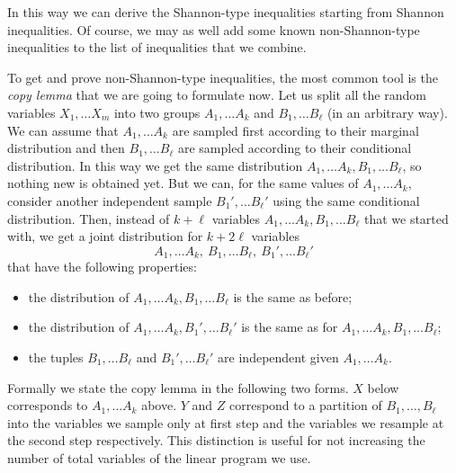 \documentclass[11pt, a4paper]{kybernetika}
\begin{document}
	In this way we can derive the Shannon-type inequalities starting from Shannon inequalities. Of course, we may as well add some known non-Shannon-type inequalities to the list of inequalities that we combine.
	
	To get and prove non-Shannon-type inequalities, the most common tool is the \emph{copy lemma} that we are going to formulate now. Let us split all the random variables $X_1,\ldots X_m$ into two groups $A_1,\ldots A_k$ and $B_1,\ldots B_\ell$ (in an arbitrary way). We can assume that $A_1,\ldots A_k$ are sampled first according to their marginal distribution and then $B_1,\ldots B_\ell$ are sampled according to their conditional distribution. In this way we get the same distribution $A_1,\ldots A_k, B_1,\ldots B_\ell$, so nothing new is obtained yet. But we can, for the same values of $A_1,\ldots A_k$, consider another independent sample $B_1',\ldots B_\ell'$ using the same conditional distribution. Then, instead of $k+\ell$ variables $A_1,\ldots A_k,B_1,\ldots B_\ell$ that we started with, we get a joint distribution for $k+2\ell$ variables
	\[
	A_1,\ldots A_k,\ B_1,\ldots B_\ell,\ B_1',\ldots B_\ell'
	\]
	that have the following properties:
	\begin{itemize}
		\item 
		the distribution of $A_1,\ldots A_k,B_1,\ldots B_\ell$ is the same as before;
		\item
		the distribution of $A_1,\ldots A_k,B_1',\ldots B_\ell'$ is the same as for $A_1,\ldots A_k,B_1,\ldots B_\ell$;
		\item
		the tuples $B_1,\ldots B_\ell$ and $B_1',\ldots B_\ell'$ are independent given $A_1,\ldots A_k$.
	\end{itemize}
	
	Formally we state the copy lemma in the following two forms. $X$ below corresponds to $A_1,\ldots A_k$ above. $Y$ and $Z$ correspond to a partition of $B_1,\ldots,B_\ell$ into the variables we sample only at first step and the variables we resample at the second step respectively. This distinction is useful for not increasing the number of total variables of the linear program we use.
	
\end{document}
